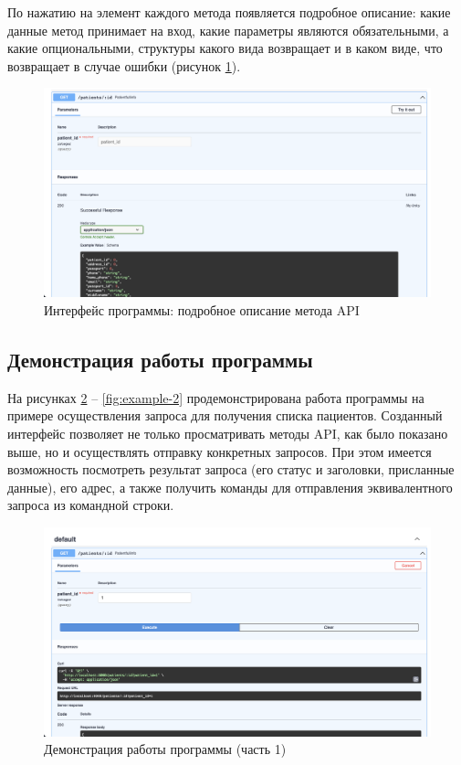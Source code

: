 По нажатию на элемент каждого метода появляется подробное описание: какие данные метод принимает на вход, какие параметры являются обязательными, а какие опциональными, структуры какого вида возвращает и в каком виде, что возвращает в случае ошибки (рисунок \ref{fig:interface-2}).
\begin{figure}[h]
	\centering
	\captionsetup{justification=centering}
	\includegraphics[width=170mm]{img/interface-2.png}
	\caption{Интерфейс программы: подробное описание метода API}
	\label{fig:interface-2}
\end{figure}


\subsection{Демонстрация работы программы}

На рисунках \ref{fig:example-1} -- \ref{fig:example-2} продемонстрирована работа программы на примере осуществления запроса для получения списка пациентов. Созданный интерфейс позволяет не только просматривать методы API, как было показано выше, но и осуществлять отправку конкретных запросов.
При этом имеется возможность посмотреть результат запроса (его статус и заголовки, присланные данные), его адрес, а также получить команды для отправления эквивалентного запроса из командной строки.

\clearpage

\begin{figure}[h]
	\centering
	\captionsetup{justification=centering}
	\includegraphics[width=152mm]{img/example-1.png}
	\caption{Демонстрация  работы  программы  (часть 1)}
	\label{fig:example-1}
\end{figure}


